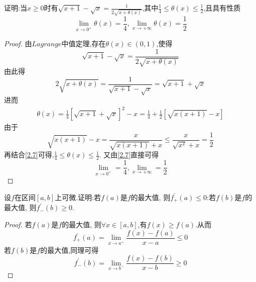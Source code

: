 \documentclass[lang=cn,newtx,10pt,scheme=chinese]{../Template/elegantbook}
\begin{document}
\begin{exercise}
证明:当\(x\geqslant 0\)时有\(\sqrt{x+1}-\sqrt{x}=\frac{1}{2\sqrt{x+\theta(x)}}\),其中\(\frac{1}{4}\leqslant \theta(x)\leqslant \frac{1}{2}\),且具有性质
\begin{equation}
\lim\limits_{x\to0^{+}}\theta(x)=\frac{1}{4},\lim\limits_{x\to+\infty}\theta(x)=\frac{1}{2}
    \nonumber
\end{equation}

    \begin{proof}
    由$Lagrange$中值定理,存在$\theta(x)\in(0,1)$,使得
    \begin{equation}
    \sqrt{x+1}-\sqrt{x}=\frac{1}{2\sqrt{x+\theta(x)}}
        \nonumber
    \end{equation}
    由此得
    \begin{equation}
    2\sqrt{x+\theta(x)}=\frac{1}{\sqrt{x+1}-\sqrt{x}}=\sqrt{x+1}+\sqrt{x}
        \nonumber
    \end{equation}
    进而
    \begin{equation}\label{2.7}
    \begin{split}
    \theta(x)=\frac{1}{4}[\sqrt{x+1}+\sqrt{x}]^2-x
    =\frac{1}{4}+\frac{1}{2}[\sqrt{x(x+1)}-x]
    \end{split}
    \end{equation}
    由于
    \begin{equation}
    \sqrt{x(x+1)}-x=\frac{x}{\sqrt{x(x+1)}+x}\leqslant \frac{x}{\sqrt{x^2}+x}=\frac{1}{2}
    \nonumber
    \end{equation}
    再结合\eqref{2.7}可得,$\frac{1}{4}\le\theta(x)\le\frac{1}{2}$.
    又由\eqref{2.7}直接可得
    \begin{equation}
    \lim_{x \to 0^{+}} =\frac{1}{4},\lim_{x \to +\infty}=\frac{1}{2}
        \nonumber
    \end{equation}
    
\end{proof}
\end{exercise}

\begin{exercise}
    设\(f\)在区间\([a,b]\)上可微.证明:若\(f(a)\)是\(f\)的最大值,
    则\(f^{\prime}_{+}(a)\leqslant 0\):若\(f(b)\)是\(f\)的最大值,
    则\(f^{\prime}_{-}(b)\geqslant 0\).
    \begin{proof}
        若\(f(a)\)是\(f\)的最大值,
        则$\forall x\in[a,b]$,有$f(x) \geqslant f(a)$.从而
        \begin{equation}
            f_{+}^{\prime}(a)=\lim_{x\rightarrow a^+} \frac{f(x)-f(a)}{x-a}\leqslant 0
            \nonumber
        \end{equation}
        若\(f(b)\)是\(f\)的最大值,同理可得
        \begin{equation}
            f_{-}^{\prime}(b)=\lim_{x\rightarrow b^-} \frac{f(x)-f(b)}{x-b}\geqslant 0
            \nonumber
        \end{equation}
    
\end{proof}
\end{exercise}
\end{document}
